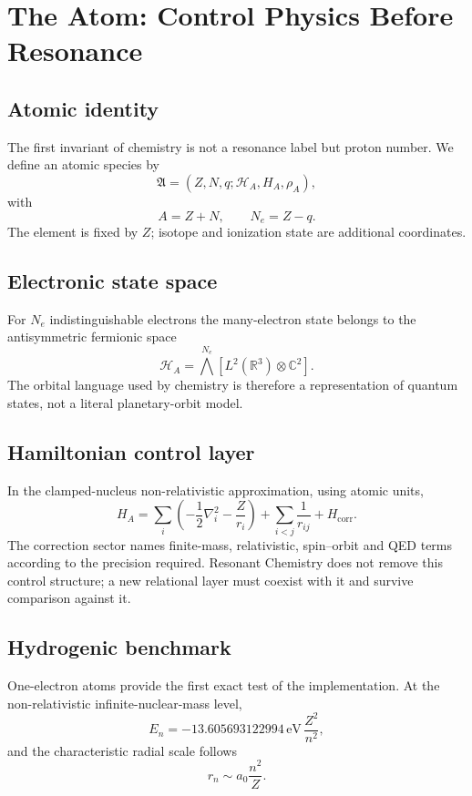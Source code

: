 \chapter{The Atom: Control Physics Before Resonance}

\section{Atomic identity}
The first invariant of chemistry is not a resonance label but proton number. We define an atomic species by
\begin{equation}
\mathfrak A=(Z,N,q;\mathcal H_A,H_A,\rho_A),
\end{equation}
with
\begin{equation}
A=Z+N,\qquad N_e=Z-q.
\end{equation}
The element is fixed by $Z$; isotope and ionization state are additional coordinates.

\section{Electronic state space}
For $N_e$ indistinguishable electrons the many-electron state belongs to the antisymmetric fermionic space
\begin{equation}
\mathcal H_A=\bigwedge^{N_e}\left[L^2(\mathbb R^3)\otimes\mathbb C^2\right].
\end{equation}
The orbital language used by chemistry is therefore a representation of quantum states, not a literal planetary-orbit model.

\section{Hamiltonian control layer}
In the clamped-nucleus non-relativistic approximation, using atomic units,
\begin{equation}
H_A=\sum_i\left(-\frac12\nabla_i^2-\frac{Z}{r_i}\right)+\sum_{i<j}\frac{1}{r_{ij}}+H_{\mathrm{corr}}.
\end{equation}
The correction sector names finite-mass, relativistic, spin--orbit and QED terms according to the precision required. Resonant Chemistry does not remove this control structure; a new relational layer must coexist with it and survive comparison against it.

\section{Hydrogenic benchmark}
One-electron atoms provide the first exact test of the implementation. At the non-relativistic infinite-nuclear-mass level,
\begin{equation}
E_n=-13.605693122994\,\mathrm{eV}\,\frac{Z^2}{n^2},
\end{equation}
and the characteristic radial scale follows
\begin{equation}
r_n\sim a_0\frac{n^2}{Z}.
\end{equation}

